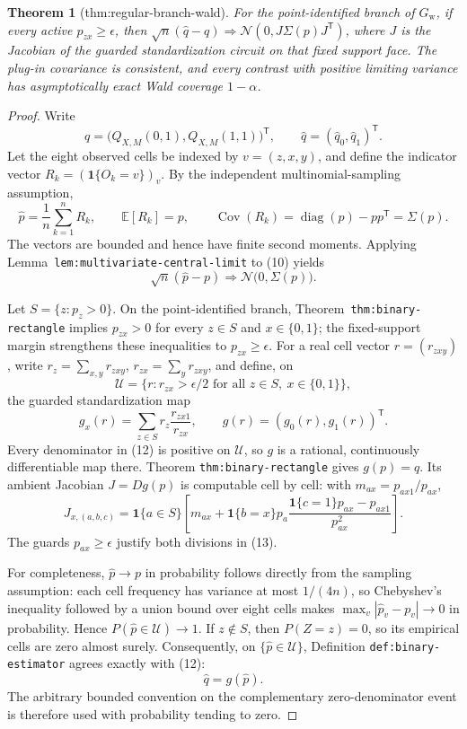 \documentclass{article}
\newtheorem{theorem}{Theorem}
\begin{document}
\begin{theorem}[thm:regular-branch-wald]\label{thm:regular-branch-wald}
For the point-identified branch of \(G_{\mathrm w}\), if every active \(p_{zx}\ge\epsilon\), then \(\sqrt n(\widehat q-q)\Rightarrow\mathcal N(0,J\Sigma(p)J^{\mathsf T})\), where \(J\) is the Jacobian of the guarded standardization circuit on that fixed support face. The plug-in covariance is consistent, and every contrast with positive limiting variance has asymptotically exact Wald coverage \(1-\alpha\).
\end{theorem}
\begin{proof}
Write
\[
q=\bigl(Q_{X,M}(0,1),Q_{X,M}(1,1)\bigr)^{\mathsf T},
\qquad
\widehat q=(\widehat q_0,\widehat q_1)^{\mathsf T}.
\]
Let the eight observed cells be indexed by \(v=(z,x,y)\), and define the
indicator vector \(R_k=(\mathbf 1\{O_k=v\})_v\).  By the independent
multinomial-sampling assumption,
\[
\widehat p=\frac1n\sum_{k=1}^nR_k,
\qquad
\mathbb E[R_k]=p,
\qquad
\operatorname{Cov}(R_k)=\operatorname{diag}(p)-pp^{\mathsf T}=\Sigma(p).
\tag{10}
\]
The vectors are bounded and hence have finite second moments.  Applying
Lemma~\texttt{lem:multivariate-central-limit} to (10) yields
\[
\sqrt n(\widehat p-p)\Rightarrow
\mathcal N\bigl(0,\Sigma(p)\bigr).
\tag{11}
\]

Let \(S=\{z:p_z>0\}\).  On the point-identified branch,
Theorem~\texttt{thm:binary-rectangle} implies
\(p_{zx}>0\) for every \(z\in S\) and \(x\in\{0,1\}\); the fixed-support
margin strengthens these inequalities to \(p_{zx}\ge\epsilon\).  For a
real cell vector \(r=(r_{zxy})\), write
\(r_z=\sum_{x,y}r_{zxy}\), \(r_{zx}=\sum_yr_{zxy}\), and define, on
\[
\mathcal U=\{r:r_{zx}>\epsilon/2
\text{ for all }z\in S,\ x\in\{0,1\}\},
\]
the guarded standardization map
\[
g_x(r)=\sum_{z\in S}r_z\frac{r_{zx1}}{r_{zx}},
\qquad
g(r)=(g_0(r),g_1(r))^{\mathsf T}.
\tag{12}
\]
Every denominator in (12) is positive on \(\mathcal U\), so \(g\) is a
rational, continuously differentiable map there.  Theorem
\texttt{thm:binary-rectangle} gives \(g(p)=q\).  Its ambient Jacobian
\(J=Dg(p)\) is computable cell by cell: with
\(m_{ax}=p_{ax1}/p_{ax}\),
\[
J_{x,(a,b,c)}
=\mathbf 1\{a\in S\}
\left[
m_{ax}
+\mathbf 1\{b=x\}p_a
\frac{\mathbf 1\{c=1\}p_{ax}-p_{ax1}}{p_{ax}^2}
\right].
\tag{13}
\]
The guards \(p_{ax}\ge\epsilon\) justify both divisions in (13).

For completeness, \(\widehat p\to p\) in probability follows directly from
the sampling assumption: each cell frequency has variance at most \(1/(4n)\),
so Chebyshev's inequality followed by a union bound over eight cells makes
\(\max_v|\widehat p_v-p_v|\to0\) in probability.  Hence
\(P(\widehat p\in\mathcal U)\to1\).  If \(z\notin S\), then \(P(Z=z)=0\),
so its empirical cells are zero almost surely.  Consequently, on
\(\{\widehat p\in\mathcal U\}\), Definition
\texttt{def:binary-estimator} agrees exactly with (12):
\[
\widehat q=g(\widehat p).
\tag{14}
\]
The arbitrary bounded convention on the complementary zero-denominator
event is therefore used with probability tending to zero.


\end{proof}
\end{document}
